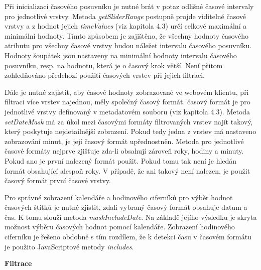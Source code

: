 Při inicializaci časového posuvníku je nutné brát v potaz odlišné časové intervaly pro jednotlivé vrstvy. Metoda \textit{getSliderRange} postupně projde viditelné časové vrstvy a z hodnot jejich \textit{timeValues} (viz kapitola 4.3) určí celkové maximální a minimální hodnoty. Tímto způsobem je zajištěno, že všechny hodnoty časového atributu pro všechny časové vrstvy budou náležet intervalu časového posuvníku. Hodnoty šoupátek jsou nastaveny na minimální hodnoty intervalu časového posuvníku, resp. na hodnotu, která je o časový krok větší. Není přitom zohledňováno předchozí použití časových vrstev při jejich filtraci.

Dále je nutné zajistit, aby časové hodnoty zobrazované ve webovém klientu, při filtraci více vrstev najednou, měly společný časový formát. časový formát je pro jednotlivé vrstvy definovaný v metadatovém souboru (viz kapitola 4.3). Metoda \textit{setDateMask} má za úkol mezi časovými formáty filtrovaných vrstev najít takový, který poskytuje nejdetailnější zobrazení. Pokud tedy jedna z vrstev má nastaveno zobrazování minut, je její časový formát upřednostněn. Metoda pro jednotlivé časové formáty nejprve zjišťuje zda-li obsahují zároveň roky, hodiny a minuty. Pokud ano je první nalezený formát použit. Pokud tomu tak není je hledán formát obsahující alespoň roky. V případě, že ani takový není nalezen, je použit časový formát první časové vrstvy.

Pro správné zobrazení kalendáře a hodinového ciferníků pro výběr hodnot časových štítků je nutné zjistit, zdali vybraný časový formát obsahuje datum a čas. K tomu slouží metoda \textit{maskIncludeDate}. Na základě jejího výsledku je skryta možnost výběru časových hodnot pomocí kalendáře. Zobrazení hodinového ciferníku je řešeno obdobně s tím rozdílem, že k detekci času v časovém formátu je použito JavaScriptové metody \textit{includes}.

\bigskip
\noindent \textbf{Filtrace}

